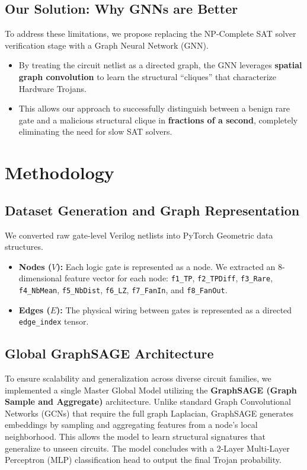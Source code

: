 \documentclass[conference]{IEEEtran}
\begin{document}
\subsection{Our Solution: Why GNNs are Better}
To address these limitations, we propose replacing the NP-Complete SAT solver verification stage with a Graph Neural Network (GNN). 
\begin{itemize}
    \item By treating the circuit netlist as a directed graph, the GNN leverages \textbf{spatial graph convolution} to learn the structural ``cliques'' that characterize Hardware Trojans.
    \item This allows our approach to successfully distinguish between a benign rare gate and a malicious structural clique in \textbf{fractions of a second}, completely eliminating the need for slow SAT solvers.
\end{itemize}

\section{Methodology}

\subsection{Dataset Generation and Graph Representation}
We converted raw gate-level Verilog netlists into PyTorch Geometric data structures. 
\begin{itemize}
    \item \textbf{Nodes ($V$):} Each logic gate is represented as a node. We extracted an 8-dimensional feature vector for each node: \texttt{f1\_TP}, \texttt{f2\_TPDiff}, \texttt{f3\_Rare}, \texttt{f4\_NbMean}, \texttt{f5\_NbDist}, \texttt{f6\_LZ}, \texttt{f7\_FanIn}, and \texttt{f8\_FanOut}.
    \item \textbf{Edges ($E$):} The physical wiring between gates is represented as a directed \texttt{edge\_index} tensor.
\end{itemize}

\subsection{Global GraphSAGE Architecture}
To ensure scalability and generalization across diverse circuit families, we implemented a single Master Global Model utilizing the \textbf{GraphSAGE (Graph Sample and Aggregate)} architecture. 
Unlike standard Graph Convolutional Networks (GCNs) that require the full graph Laplacian, GraphSAGE generates embeddings by sampling and aggregating features from a node's local neighborhood. This allows the model to learn structural signatures that generalize to unseen circuits. The model concludes with a 2-Layer Multi-Layer Perceptron (MLP) classification head to output the final Trojan probability.
\end{document}
